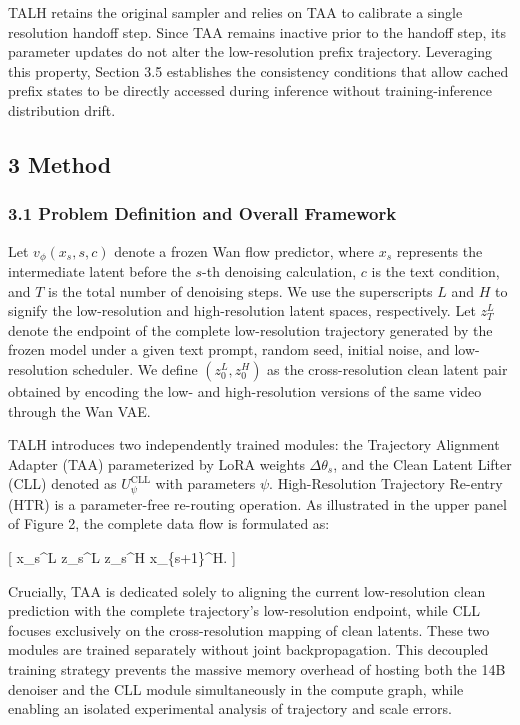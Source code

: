 TALH retains the original sampler and relies on TAA to calibrate a single resolution handoff step. Since TAA remains inactive prior to the handoff step, its parameter updates do not alter the low-resolution prefix trajectory. Leveraging this property, Section 3.5 establishes the consistency conditions that allow cached prefix states to be directly accessed during inference without training-inference distribution drift.

\hypertarget{method}{%
\subsection{3 Method}\label{method}}

\hypertarget{problem-definition-and-overall-framework}{%
\subsubsection{3.1 Problem Definition and Overall Framework}\label{problem-definition-and-overall-framework}}

Let \(v_\phi(x_s, s, c)\) denote a frozen Wan flow predictor, where \(x_s\) represents the intermediate latent before the \(s\)-th denoising calculation, \(c\) is the text condition, and \(T\) is the total number of denoising steps. We use the superscripts \(L\) and \(H\) to signify the low-resolution and high-resolution latent spaces, respectively. Let \(z_T^L\) denote the endpoint of the complete low-resolution trajectory generated by the frozen model under a given text prompt, random seed, initial noise, and low-resolution scheduler. We define \((z_0^L, z_0^H)\) as the cross-resolution clean latent pair obtained by encoding the low- and high-resolution versions of the same video through the Wan VAE.

TALH introduces two independently trained modules: the Trajectory Alignment Adapter (TAA) parameterized by LoRA weights \(\Delta\theta_s\), and the Clean Latent Lifter (CLL) denoted as \(U_\psi^{\mathrm{CLL}}\) with parameters \(\psi\). High-Resolution Trajectory Re-entry (HTR) is a parameter-free re-routing operation. As illustrated in the upper panel of Figure 2, the complete data flow is formulated as:

{[} x\_s\^{}L  \widetilde z\_s\^{}L  \widehat z\_s\^{}H  x\_\{s+1\}\^{}H. {]}

Crucially, TAA is dedicated solely to aligning the current low-resolution clean prediction with the complete trajectory's low-resolution endpoint, while CLL focuses exclusively on the cross-resolution mapping of clean latents. These two modules are trained separately without joint backpropagation. This decoupled training strategy prevents the massive memory overhead of hosting both the 14B denoiser and the CLL module simultaneously in the compute graph, while enabling an isolated experimental analysis of trajectory and scale errors.

